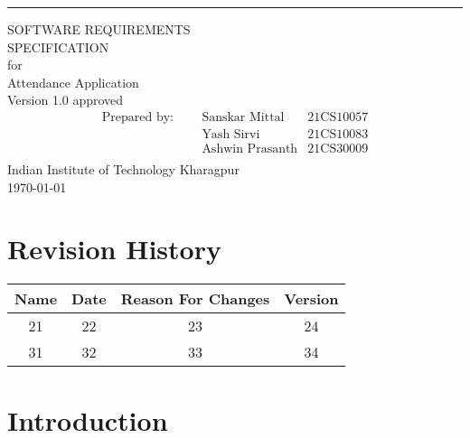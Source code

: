 \documentclass{scrreprt}
\date{}
\def\myversion{1.0 }
\begin{document}
\begin{flushright}
    \rule{16cm}{5pt}\vskip1cm
    \begin{bfseries}
        \Huge{SOFTWARE REQUIREMENTS\\ SPECIFICATION}\\
        \vspace{1cm}
        for\\
        \vspace{1cm}
        Attendance Application\\
        \vspace{1cm}
        \LARGE{Version \myversion approved}\\
        \vspace{0cm}
        \begin{align*}
        \text{Prepared by: } \;\;\;\; 
         &\text{Sanskar Mittal} &\text{21CS10057}\\
         &\text{Yash Sirvi} &\text{21CS10083}\\
         &\text{Ashwin Prasanth} &\text{21CS30009}\\
        \end{align*}
        \vspace{1.9cm}
        Indian Institute of Technology Kharagpur\\
        \vspace{1.9cm}
        \today\\
    \end{bfseries}
\end{flushright}

\tableofcontents


\chapter*{Revision History}

\begin{center}
    \begin{tabular}{|c|c|c|c|}
        \hline
	    Name & Date & Reason For Changes & Version\\
        \hline
	    21 & 22 & 23 & 24\\
        \hline
	    31 & 32 & 33 & 34\\
        \hline
    \end{tabular}
\end{center}

\chapter{Introduction}
\end{document}
